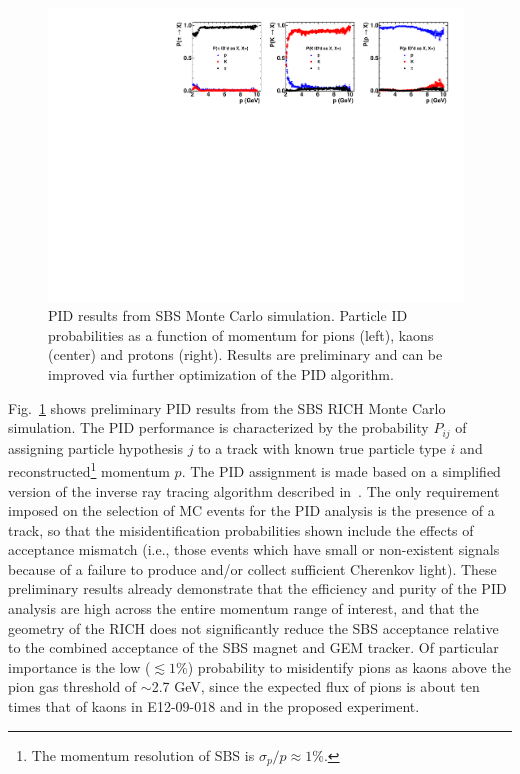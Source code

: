 \begin{figure}[h]
  \begin{center}
    \includegraphics[width=0.98\textwidth]{figures/SBS_PIDfig.pdf}
  \end{center}
  \caption{\label{RICHfig2} PID results from SBS Monte Carlo simulation. Particle ID probabilities as a function of momentum for pions (left), kaons (center) and protons (right). Results are preliminary and can be improved via further optimization of the PID algorithm.}
\end{figure}
Fig.~\ref{RICHfig2} shows preliminary PID results from the SBS RICH Monte Carlo simulation. The PID performance is characterized by the probability $P_{ij}$ of assigning particle hypothesis $j$ to a track with known true particle type $i$ and reconstructed\footnote{The momentum resolution of SBS is $\sigma_p/p \approx 1\%$.} momentum $p$. The PID assignment is made based on a simplified version of the inverse ray tracing algorithm described in~\cite{HERMES_RICH_long_NIM}. The only requirement imposed on the selection of MC events for the PID analysis is the presence of a track, so that the misidentification probabilities shown include the effects of acceptance mismatch (i.e., those events which have small or non-existent signals because of a failure to produce and/or collect sufficient Cherenkov light). These preliminary results already demonstrate that the efficiency and purity of the PID analysis are high across the entire momentum range of interest, and that the geometry of the RICH does not significantly reduce the SBS acceptance relative to the combined acceptance of the SBS magnet and GEM tracker. Of particular importance is the low ($\lesssim 1\%$) probability to misidentify pions as kaons above the pion gas threshold of $\sim$2.7 GeV, since the expected flux of pions is about ten times that of kaons in E12-09-018 and in the proposed experiment.

